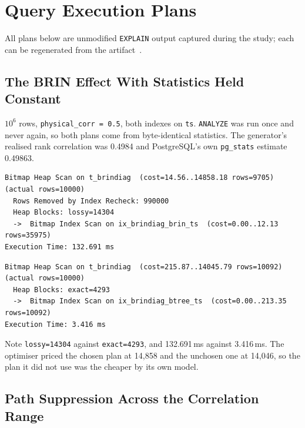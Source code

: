 \documentclass[12pt, a4paper]{article}
\begin{document}
\newpage
\printbibliography[heading=bibnumbered, title={References}]

\newpage
\appendix

\section{Query Execution Plans}
\label{app:plans}

All plans below are unmodified \texttt{EXPLAIN} output captured during
the study; each can be regenerated from the artifact~\cite{artifact2026}.

\subsection{The BRIN Effect With Statistics Held Constant}

$10^6$ rows, \texttt{physical\_corr = 0.5}, both indexes on \texttt{ts}.
\texttt{ANALYZE} was run once and never again, so both plans come from
byte-identical statistics. The generator's realised rank correlation was
0.4984 and PostgreSQL's own \texttt{pg\_stats} estimate 0.49863.

\begin{lstlisting}[caption={Plan chosen with both indexes available.}]
Bitmap Heap Scan on t_brindiag  (cost=14.56..14858.18 rows=9705) (actual rows=10000)
  Rows Removed by Index Recheck: 990000
  Heap Blocks: lossy=14304
  ->  Bitmap Index Scan on ix_brindiag_brin_ts  (cost=0.00..12.13 rows=35975)
Execution Time: 132.691 ms
\end{lstlisting}

\begin{lstlisting}[caption={Same query, same statistics, BRIN index removed.}]
Bitmap Heap Scan on t_brindiag  (cost=215.87..14045.79 rows=10092) (actual rows=10000)
  Heap Blocks: exact=4293
  ->  Bitmap Index Scan on ix_brindiag_btree_ts  (cost=0.00..213.35 rows=10092)
Execution Time: 3.416 ms
\end{lstlisting}

Note \texttt{lossy=14304} against \texttt{exact=4293}, and 132.691\,ms
against 3.416\,ms. The optimiser priced the chosen plan at 14{,}858 and
the unchosen one at 14{,}046, so the plan it did not use was the cheaper
by its own model.

\subsection{Path Suppression Across the Correlation Range}
\end{document}
